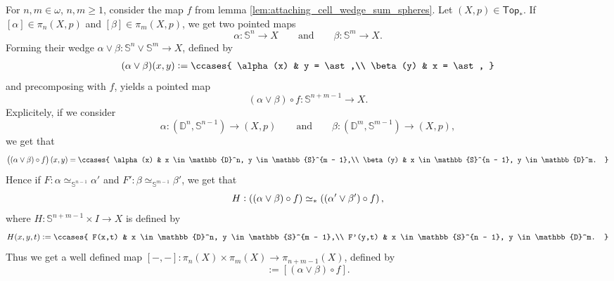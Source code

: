 For $n,m \in \omega$, $n,m \geq 1$, consider the map $f$ from lemma \ref{lem:attaching_cell_wedge_sum_spheres}. Let $(X,p) \in \mathsf{Top}_*$. If $[\alpha] \in \pi_n(X,p)$ and $[\beta] \in \pi_m(X,p)$, we get two pointed maps
\begin{equation*}
	\alpha : \mathbb{S}^n \to X \qquad \text{and} \qquad \beta : \mathbb{S}^m \to X.
\end{equation*}
Forming their wedge $\alpha \vee \beta : \mathbb{S}^n \vee \mathbb{S}^m \to X$, defined by
\begin{align*}
	(\alpha \vee \beta) (x,y) := \ccases{
		\alpha(x) & y = \ast,\\
		\beta(y) & x = \ast,
	}
\end{align*}
\noindent and precomposing with $f$, yields a pointed map
\begin{equation*}
	(\alpha \vee \beta) \circ f : \mathbb{S}^{n + m - 1} \to X.
\end{equation*}
Explicitely, if we consider
\begin{equation*}
	\alpha : (\mathbb{D}^n,\mathbb{S}^{n - 1}) \to (X,p) \qquad \text{and} \qquad \beta : (\mathbb{D}^m,\mathbb{S}^{m - 1}) \to (X,p),
\end{equation*}
\noindent we get that
\begin{align*}
	\del[1]{(\alpha \vee \beta) \circ f}(x,y) = \ccases{
		\alpha(x) & x \in \mathbb{D}^n, y \in \mathbb{S}^{m - 1},\\
		\beta(y) & x \in \mathbb{S}^{n - 1}, y \in \mathbb{D}^m.
	}
\end{align*}
Hence if $F : \alpha \simeq_{\mathbb{S}^{n - 1}} \alpha'$ and $F' : \beta \simeq_{\mathbb{S}^{m - 1}} \beta'$, we get that 
\begin{equation*}
	H : \del[0]{(\alpha \vee \beta) \circ f} \simeq_\ast \del[0]{(\alpha' \vee \beta') \circ f},
\end{equation*}
\noindent where $H : \mathbb{S}^{n + m - 1} \times I \to X$ is defined by
\begin{align*}
	H(x,y,t) := \ccases{
		F(x,t) & x \in \mathbb{D}^n, y \in \mathbb{S}^{m - 1},\\
		F'(y,t) & x \in \mathbb{S}^{n - 1}, y \in \mathbb{D}^m.
	}
\end{align*}
Thus we get a well defined map $[-,-] : \pi_n(X) \times \pi_m(X) \to \pi_{n + m - 1}(X)$, defined by
\begin{equation*}
	[\alpha,\beta] := [(\alpha \vee \beta) \circ f].
\end{equation*}

